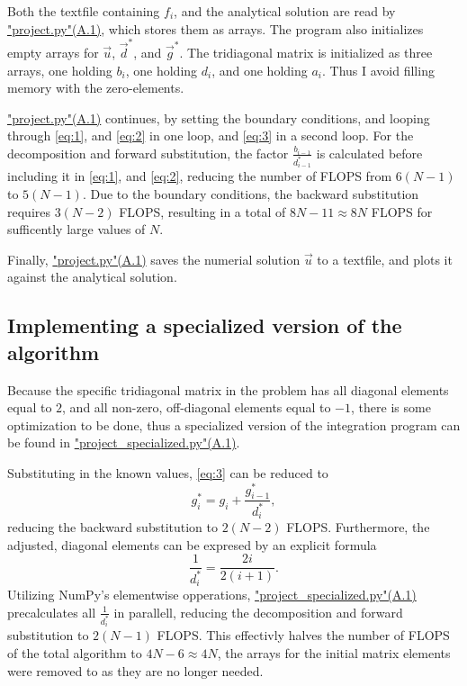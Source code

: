 \documentclass[english,notitlepage,reprint]{revtex4-1}  %
\begin{document}
Both the textfile containing \(f_{i}\), and the analytical solution are read by \hyperref[A:1]{"project.py"(A.1)}, which stores them as arrays. The program also initializes empty arrays for \(\vec{u}\), \(\vec{d}^{*}\), and \(\vec{g}^{*}\). The tridiagonal matrix is initialized as three arrays, one holding \(b_{i}\), one holding \(d_{i}\), and one holding \(a_{i}\). Thus I avoid filling memory with the zero-elements.

\hyperref[A:1]{"project.py"(A.1)} continues, by setting the boundary conditions, and looping through \eqref{eq:1}, and \eqref{eq:2} in one loop, and \eqref{eq:3} in a second loop. For the decomposition and forward substitution, the factor \(\frac{b_{i-1}}{d_{i-1}^{*}}\) is calculated before including it in \eqref{eq:1}, and \eqref{eq:2}, reducing the number of FLOPS from \(6(N-1)\) to \(5(N-1)\). Due to the boundary conditions, the backward substitution requires \(3(N-2)\) FLOPS, resulting in a total of \(8N-11\approx 8N\) FLOPS for sufficently large values of \(N\).

Finally, \hyperref[A:1]{"project.py"(A.1)} saves the numerial solution \(\vec{u}\) to a textfile, and plots it against the analytical solution.

\subsection{Implementing a specialized version of the algorithm}\label{subsec:32}
Because the specific tridiagonal matrix in the problem has all diagonal elements equal to \(2\), and all non-zero, off-diagonal elements equal to \(-1\), there is some optimization to be done, thus a specialized version of the integration program can be found in \hyperref[A:2]{"project\_specialized.py"(A.1)}.

Substituting in the known values, \eqref{eq:3} can be reduced to
$$
	g_{i}^{*} = g_{i} + \frac{g_{i-1}^{*}}{d_{i}^{*}},
$$
reducing the backward substitution to \(2(N-2)\) FLOPS.
Furthermore, the adjusted, diagonal elements can be expresed by an explicit formula
$$
	\frac{1}{d_{i}^{*}}=\frac{2i}{2(i+1)}.
$$
Utilizing NumPy's elementwise opperations, \hyperref[A:2]{"project\_specialized.py"(A.1)} precalculates all \(\frac{1}{d_{i}^{*}}\) in parallell, reducing the decomposition and forward substitution to \(2(N-1)\) FLOPS. This effectivly halves the number of FLOPS of the total algorithm to \(4N-6\approx 4N\), the arrays for the initial matrix elements were removed to as they are no longer needed.
\end{document}
